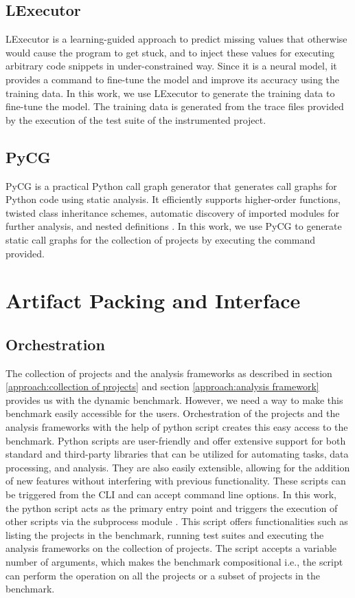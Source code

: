 \subsection{LExecutor}
LExecutor is a learning-guided approach to predict missing values that otherwise would cause the program to get stuck, and to inject these values for executing arbitrary code snippets in under-constrained way.\cite{LExecutor_2023}
Since it is a neural model, it provides a command to fine-tune the model and improve its accuracy using the training data.
In this work, we use LExecutor to generate the training data to fine-tune the model.
The training data is generated from the trace files provided by the execution of the test suite of the instrumented project.
\subsection{PyCG}
PyCG is a practical Python call graph generator that generates call graphs for Python code using static analysis.
It efficiently supports higher-order functions, twisted class inheritance schemes, automatic discovery of imported modules for further analysis, and nested definitions \cite{PyCG_2021}.
In this work, we use PyCG to generate static call graphs for the collection of projects by executing the command provided. 

\section{Artifact Packing and Interface}
\label{approach:artifact packaging and interface}

\subsection{Orchestration}
\label{approach:python script}
The collection of projects and the analysis frameworks as described in section \ref{approach:collection of projects} and section \ref{approach:analysis framework} provides us with the dynamic benchmark. 
However, we need a way to make this benchmark easily accessible for the users.
Orchestration of the projects and the analysis frameworks with the help of python script creates this easy access to the benchmark.
Python scripts are user-friendly and offer extensive support for both standard and third-party libraries that can be utilized for automating tasks, data processing, and analysis.
They are also easily extensible, allowing for the addition of new features without interfering with previous functionality.
These scripts can be triggered from the CLI and can accept command line options.
In this work, the python script acts as the primary entry point and triggers the execution of other scripts via the subprocess module \cite{python_subprocess}.
This script offers functionalities such as listing the projects in the benchmark, running test suites and executing the analysis frameworks on the collection of projects.  
The script accepts a variable number of arguments, which makes the benchmark compositional i.e., the script can perform the operation on all the projects or a subset of projects in the benchmark. 

